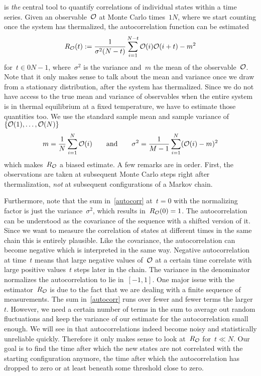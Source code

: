  is \emph{the} central tool to quantify correlations of
individual states within a time series. Given an observable~$\mathcal{O}$ at Monte Carlo
times~$\numlist{1}{N}$, where we start counting once the system has thermalized,
the autocorrelation function can be estimated
%
\begin{equation}\label{autocorr}
  R_{\mathcal{O}}(t) := \frac{1}{\sigma^2 (N-t)} \sum_{i = 1}^{N-t}
    \mathcal{O}(i) \mathcal{O}(i+t) - m^2
\end{equation}
%
for~$t \in \numlist{0}{N-1}$, where~$\sigma^2$ is the variance and~$m$ the mean
of the observable~$\mathcal{O}$. Note that it only makes sense to talk about the mean
and variance once we draw from a stationary distribution, \ie{} after the system
has thermalized. Since we do not have access to the true mean and variance of
observables when the entire system is in thermal equilibrium at a fixed
temperature, we have to estimate those quantities too. We use the standard
sample mean and sample variance of~$\{\mathcal{O}(1),\dots,\mathcal{O}(N)\}$
%
\begin{equation}\label{samplemeanvar}
  m = \frac{1}{N} \sum_{i=1}^N \mathcal{O}(i) \qquad\text{and}\qquad
  \sigma^2 = \frac{1}{M-1} \sum_{i=1}^N (\mathcal{O}(i) - m)^2
\end{equation}
%
which makes~$R_{\mathcal{O}}$ a biased estimate. A few remarks are in order. First, the
observations are taken at subsequent Monte Carlo steps right after
thermalization, \emph{not} at subsequent configurations of a Markov chain.

Furthermore, note that the sum in~\eqref{autocorr} at~$t=0$ with the normalizing
factor is just the variance~$\sigma^2$, which results in~$R_{\mathcal{O}}(0) = 1$. The
autocorrelation can be understood as the covariance of the sequence with a
shifted version of it. Since we want to measure the correlation of states at
different times in the same chain this is entirely plausible. Like the
covariance, the autocorrelation can become negative which is interpreted in the
same way. Negative autocorrelation at time~$t$ means that large negative values
of~$\mathcal{O}$ at a certain time correlate with large positive values~$t$ steps later
in the chain. The variance in the denominator normalizes the autocorrelation to
lie in~$[-1,1]$. One major issue with the estimator~$R_{\mathcal{O}}$ is due to the fact
that we are dealing with a finite sequence of measurements. The sum
in~\eqref{autocorr} runs over fewer and fewer terms the larger~$t$. However, we
need a certain number of terms in the sum to average out random fluctuations and
keep the variance of our estimate for the autocorrelation small enough. We will
see in  that autocorrelations indeed become noisy and
statistically unreliable quickly. Therefore it only makes sense to look
at~$R_{\mathcal{O}}$ for~$t \ll N$. Our goal is to find the time after which the new
states are not correlated with the starting configuration anymore, \ie{} the
time after which the autocorrelation has dropped to zero or at least beneath
some threshold close to zero.

